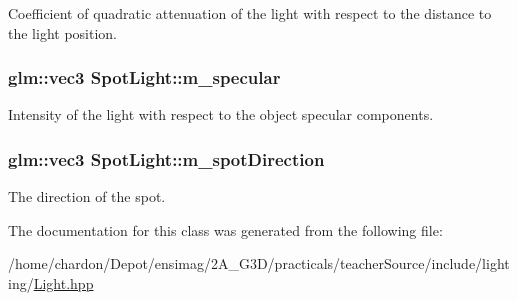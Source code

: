 Coefficient of quadratic attenuation of the light with respect to the distance to the light position. \hypertarget{classSpotLight_a6814d385600a409b73a2877afd545136}{
\subsubsection[{m\+\_\+specular}]{\setlength{\rightskip}{0pt plus 5cm}glm\+::vec3 Spot\+Light\+::m\+\_\+specular\hspace{0.3cm}{\ttfamily [private]}}}\label{classSpotLight_a6814d385600a409b73a2877afd545136}
Intensity of the light with respect to the object specular components. \hypertarget{classSpotLight_ae950bb31005fc7d62232bfc78d1ef8f6}{
\subsubsection[{m\+\_\+spot\+Direction}]{\setlength{\rightskip}{0pt plus 5cm}glm\+::vec3 Spot\+Light\+::m\+\_\+spot\+Direction\hspace{0.3cm}{\ttfamily [private]}}}\label{classSpotLight_ae950bb31005fc7d62232bfc78d1ef8f6}
The direction of the spot. 

The documentation for this class was generated from the following file\+:\begin{DoxyCompactItemize}
\item 
/home/chardon/\+Depot/ensimag/2\+A\+\_\+\+G3\+D/practicals/teacher\+Source/include/lighting/\hyperlink{Light_8hpp}{Light.\+hpp}\end{DoxyCompactItemize}
